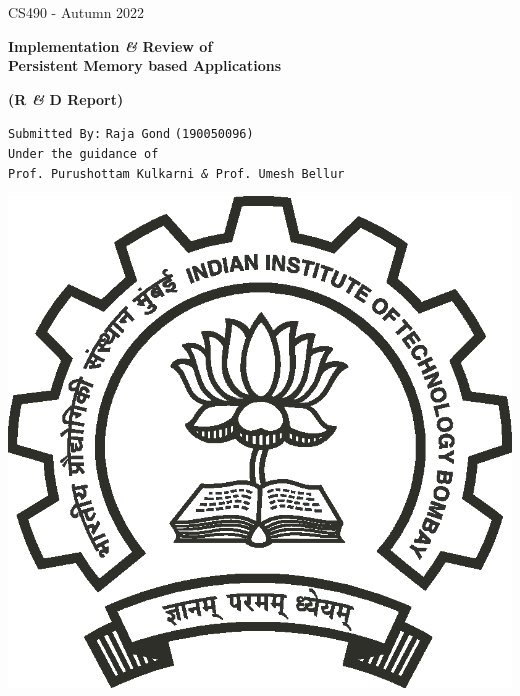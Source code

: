\documentclass[11pt,swedish, openany, oneside]{book}
\begin{document}

\begin{titlepage}
	\clearpage\thispagestyle{empty}
	\centering
	\vspace{2cm}

	{\large CS490 - Autumn 2022 \par}
	\vspace{4cm}
	{\LARGE \textbf{Implementation \textit{\&} Review of \\ Persistent Memory based Applications}} \\
	\vspace{0.4cm}
	{\large \textbf{(R \textit{\&} D Report)} \par}
	\vspace{2cm}
        {\large \texttt{Submitted By:} \texttt{Raja Gond} \texttt{(190050096)}}\\

        \vspace{1cm}
	{\large \texttt{Under the guidance of \\ Prof. Purushottam Kulkarni \textit{\&} Prof. Umesh Bellur}} 
	             \par
	\vspace{1cm}
	\vfill

    \includegraphics[scale=0.30]{iitb_logo.eps}
    

\end{titlepage}
\end{document}
